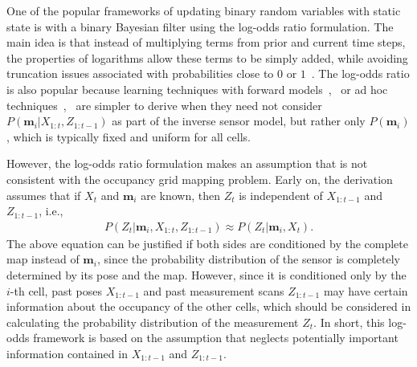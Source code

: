 \documentclass[letterpaper, 10pt, conference]{ieeeconf}
\begin{document}
One of the popular frameworks of updating binary random variables with static state is with a binary Bayesian filter using the log-odds ratio formulation.
The main idea is that instead of multiplying terms from prior and current time steps, the properties of logarithms allow these terms to be simply added, while avoiding truncation issues associated with probabilities close to $0$ or $1$~\cite{ThrBurFox05}.
The log-odds ratio is also popular because learning techniques with forward models~\cite{Thr01},~\cite{Thr03} or ad hoc techniques~\cite{MorElf85},~\cite{Elf89} are simpler to derive when they need not consider $P(\mathbf{m}_i|X_{1:t},Z_{1:t-1})$ as part of the inverse sensor model, but rather only $P(\mathbf{m}_i)$, which is typically fixed and uniform for all cells.

However, the log-odds ratio formulation makes an assumption that is not consistent with the occupancy grid mapping problem. Early on, the derivation assumes that if $X_t$ and $\mathbf{m}_i$ are known, then $Z_t$ is independent of $X_{1:t-1}$ and $Z_{1:t-1}$, i.e.,
\begin{align}
\label{eqn:AssumptionEarly}
P(Z_t|\mathbf{m}_i,X_{1:t},Z_{1:t-1})\approx P(Z_t|\mathbf{m}_i,X_t).
\end{align}
The above equation can be justified if both sides are conditioned by the complete map instead of $\mathbf{m}_i$, since the probability distribution of the sensor is completely determined by its pose and the map. However, since it is conditioned only by the $i$-th cell, past poses $X_{1:t-1}$ and past measurement scans $Z_{1:t-1}$ may have certain information about the occupancy of the other cells, which should be considered in calculating the probability distribution of the measurement $Z_t$.  In short, this log-odds framework is based on the assumption that neglects potentially important information contained in $X_{1:t-1}$ and $Z_{1:t-1}$.


\end{document}
